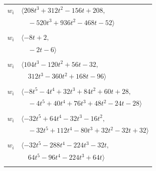 \documentclass[11pt]{article}
\begin{document}
\begin{longtable}{@{}ll@{}}
$w_i$ & $\langle 208t^{3}+312t^{2}-156t+208,$\\
 & $\quad -520t^{3}+936t^{2}-468t-52\rangle$\\
\addlinespace[2pt]
\multicolumn{2}{@{}p{0.97\textwidth}@{}}{$i=28$, $D_i=2$, $\rho_{ij}$: $5{:}2, \allowbreak 31{:}1, \allowbreak 41{:}1$}\\
$w_i$ & $\langle -8t+2,$\\
 & $\quad -2t-6\rangle$\\
\addlinespace[2pt]
\multicolumn{2}{@{}p{0.97\textwidth}@{}}{$i=29$, $D_i=8$, $\rho_{ij}$: $4{:}1, \allowbreak 18{:}1, \allowbreak 20{:}1, \allowbreak 25{:}1, \allowbreak 32{:}1, \allowbreak 50{:}2, \allowbreak 54{:}1, \allowbreak 61{:}2, \allowbreak 64{:}1, \allowbreak 65{:}1, \allowbreak 66{:}2$}\\
$w_i$ & $\langle 104t^{3}-120t^{2}+56t-32,$\\
 & $\quad 312t^{3}-360t^{2}+168t-96\rangle$\\
\addlinespace[2pt]
\multicolumn{2}{@{}p{0.97\textwidth}@{}}{$i=30$, $D_i=4$, $\rho_{ij}$: $13{:}2, \allowbreak 15{:}1, \allowbreak 19{:}2, \allowbreak 24{:}1, \allowbreak 25{:}1, \allowbreak 26{:}1, \allowbreak 33{:}1, \allowbreak 34{:}1, \allowbreak 57{:}2, \allowbreak 63{:}2, \allowbreak 70{:}1$}\\
$w_i$ & $\langle -8t^{5}-4t^{4}+32t^{3}+84t^{2}+60t+28,$\\
 & $\quad -4t^{5}+40t^{4}+76t^{3}+48t^{2}-24t-28\rangle$\\
\addlinespace[2pt]
\multicolumn{2}{@{}p{0.97\textwidth}@{}}{$i=31$, $D_i=16$, $\rho_{ij}$: $1{:}2, \allowbreak 13{:}2, \allowbreak 18{:}1, \allowbreak 24{:}1, \allowbreak 28{:}2, \allowbreak 64{:}2$}\\
$w_i$ & $\langle -32t^{5}+64t^{4}-32t^{3}-16t^{2},$\\
 & $\quad -32t^{5}+112t^{4}-80t^{3}+32t^{2}-32t+32\rangle$\\
\addlinespace[2pt]
\multicolumn{2}{@{}p{0.97\textwidth}@{}}{$i=32$, $D_i=32$, $\rho_{ij}$: $8{:}1, \allowbreak 16{:}1, \allowbreak 18{:}1, \allowbreak 19{:}1, \allowbreak 20{:}1, \allowbreak 29{:}2, \allowbreak 56{:}1, \allowbreak 57{:}1$}\\
$w_i$ & $\langle -32t^{5}-288t^{4}-224t^{3}-32t,$\\
 & $\quad 64t^{5}-96t^{4}-224t^{3}+64t\rangle$\\
\addlinespace[2pt]
\multicolumn{2}{@{}p{0.97\textwidth}@{}}{$i=33$, $D_i=4$, $\rho_{ij}$: $1{:}2, \allowbreak 5{:}2, \allowbreak 16{:}2, \allowbreak 26{:}2, \allowbreak 30{:}2, \allowbreak 36{:}2, \allowbreak 57{:}1, \allowbreak 59{:}2, \allowbreak 69{:}1$}\\

\end{longtable}
\end{document}
